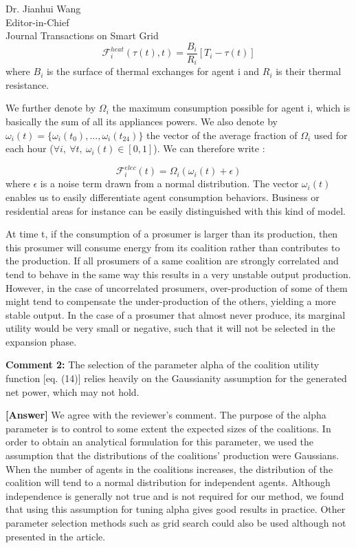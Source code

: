 \documentclass{letter}
\begin{document}
\begin{letter}{Dr. Jianhui Wang \\ Editor-in-Chief \\ Journal Transactions on Smart Grid }
\begin{equation}
\mathcal{F}_{i}^{heat}(\tau(t), t) = \frac{B_{i}}{R_{i}} \left[ T_{i} - \tau(t) \right]
\end{equation}
where $ B_{i} $ is the surface of thermal exchanges for agent i and $ R_{i} $ is their thermal resistance. 

We further denote by $ \Omega_{i} $ the maximum consumption possible for agent i, which is basically the sum of all its appliances powers. We also denote by $ \omega_{i}(t) = \{ \omega_{i}(t_{0}),...,\omega_{i}(t_{24}) \} $ the vector of the average fraction of $ \Omega_{i} $ used for each hour ($\forall i,\ \forall t,\ \omega_i(t) \in [0,1] $). We can therefore write :

\begin{equation}
\mathcal{F}_{i}^{elec}(t) = \Omega_{i} ( \omega_{i}(t) + \epsilon )
\end{equation}
where $ \epsilon $ is a noise term drawn from a normal distribution. The vector $ \omega_{i}(t) $ enables us to easily differentiate agent consumption behaviors. Business or residential areas for instance can be easily distinguished with this kind of model.

At time t, if the consumption of a prosumer is larger than its production, then this prosumer will consume energy from its coalition rather than contributes to the production. If all prosumers of a same coalition are strongly correlated and tend to behave in the same way this results in a very unstable output production. However, in the case of uncorrelated prosumers, over-production of some of them might tend to compensate the under-production of the others, yielding a more stable output. In the case of a prosumer that almost never produce, its marginal utility would be very small or negative, such that it will not be selected in the expansion phase.


\textbf{Comment 2:} The selection of the parameter alpha of the coalition utility function [eq. (14)] relies heavily on the Gaussianity assumption for the generated net power, which may not hold.


\textbf{[Answer]} We agree with the reviewer’s comment. The purpose of the alpha parameter is to control to some extent the expected sizes of the coalitions. In order to obtain an analytical formulation for this parameter, we used the assumption that the distributions of the coalitions’ production were Gaussians. When the number of agents in the coalitions increases, the distribution of the coalition will tend to a normal distribution for independent agents. Although independence is generally not true and is not required for our method, we found that using this assumption for tuning alpha gives good results in practice. Other parameter selection methods such as grid search could also be used although not presented in the article.



\end{letter}
\end{document}
